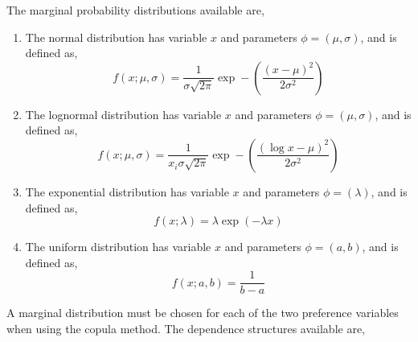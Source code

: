The marginal probability distributions available are,

\begin{enumerate}
	\item The normal distribution  has variable $x$ and parameters $\phi = (\mu,\sigma)$, and is defined as,
	\begin{equation}
	  f(x;\mu,\sigma)=\frac{1}{\sigma\sqrt{2\pi}}\exp-(\frac{(x-\mu)^2}{2\sigma^2}) 
	\end{equation}
	
	\item The lognormal distribution  has variable $x$ and parameters $\phi = (\mu,\sigma)$, and is defined as,
	\begin{equation}
	  f(x;\mu,\sigma)=\frac{1}{x_i\sigma\sqrt{2\pi}}\exp-(\frac{(\log x-\mu)^2}{2\sigma^2})
	\end{equation}
	
	\item The exponential distribution  has variable $x$ and parameters $\phi = (\lambda)$, and is defined as,
	\begin{equation}
	  f(x;\lambda)= \lambda \exp(-\lambda x)
	\end{equation}  
	
	\item The uniform distribution  has variable $x$ and parameters $\phi = (a,b)$, and is defined as,
	\begin{equation}
	  f(x;a,b)= \frac{1}{b-a}
	\end{equation}
	
\end{enumerate}

A marginal distribution must be chosen for each of the two preference variables when using the copula method. The dependence structures available are,

